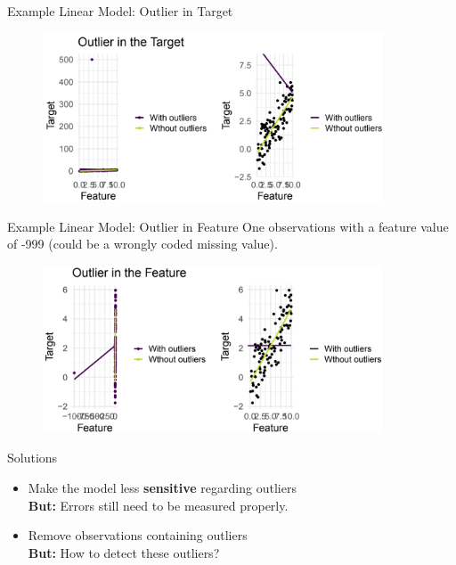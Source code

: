 \begin{vbframe}{Example Linear Model: Outlier in Target}
    \vspace{+.4cm}
    
    \begin{figure}
        \includegraphics[width = 0.9\textwidth]{figure_man/linear-model03.png}
    \end{figure}
    
\end{vbframe}

\begin{vbframe}{Example Linear Model: Outlier in Feature}
    One observations with a feature value of -999 (could be a wrongly coded missing value).
    \vspace{+.4cm}
    
    \begin{figure}
        \includegraphics[width = 0.9\textwidth]{figure_man/linear-model04.png}
    \end{figure}
    
\end{vbframe}

\begin{vbframe}{Solutions}
    \vspace{+.4cm}
    
    \begin{itemize}
        \item Make the model less \textbf{sensitive} regarding outliers \\
              \textbf{But:} Errors still need to be measured properly.
              \vspace{+.4cm}
              
        \item Remove observations containing outliers \\
              \textbf{But:} How to detect these outliers?
    \end{itemize}
\end{vbframe}

